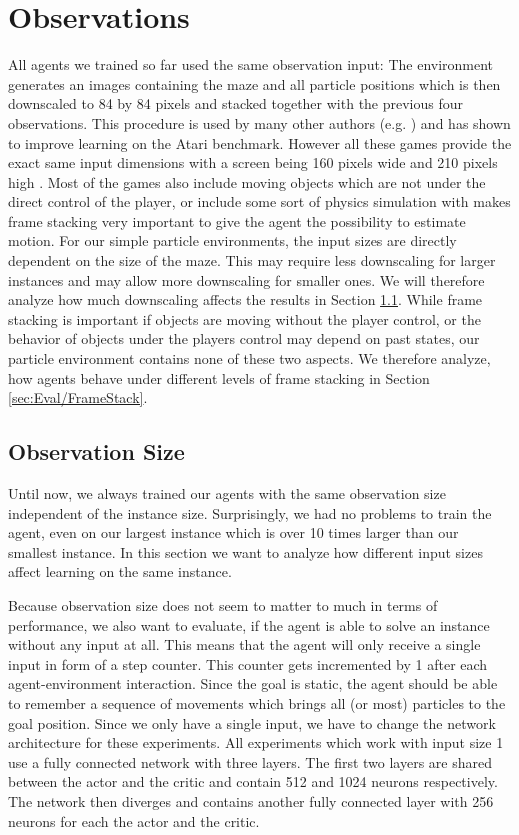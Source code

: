 \section{Observations} \label{sec:EvalObs}
All agents we trained so far used the same observation input: The environment generates an images containing the maze and all particle positions which is then downscaled to 84 by 84 pixels and stacked together with the previous four observations. This procedure is used by many other authors (e.g. \cite{burda2018large, mnih2015human}) and has shown to improve learning on the Atari benchmark. However all these games provide the exact same input dimensions with a screen being 160 pixels wide and 210 pixels high \cite{bellemare2013arcade}. Most of the games also include moving objects which are not under the direct control of the player, or include some sort of physics simulation with makes frame stacking very important to give the agent the possibility to estimate motion. For our simple particle environments, the input sizes are directly dependent on the size of the maze. This may require less downscaling for larger instances and may allow more downscaling for smaller ones. We will therefore analyze how much downscaling affects the results in Section \ref{sec:Eval/ObsSize}. While frame stacking is important if objects are moving without the player control, or the behavior of objects under the players control may depend on past states, our particle environment contains none of these two aspects. We therefore analyze, how agents behave under different levels of frame stacking in Section \ref{sec:Eval/FrameStack}.


\subsection{Observation Size} \label{sec:Eval/ObsSize}
Until now, we always trained our agents with the same observation size independent of the instance size. Surprisingly, we had no problems to train the agent, even on our largest instance which is over 10 times larger than our smallest instance. In this section we want to analyze how different input sizes affect learning on the same instance. 

Because observation size does not seem to matter to much in terms of performance, we also want to evaluate, if the agent is able to solve an instance without any input at all. This means that the agent will only receive a single input in form of a step counter. This counter gets incremented by 1 after each agent-environment interaction. Since the goal is static, the agent should be able to remember a sequence of movements which brings all (or most) particles to the goal position. Since we only have a single input, we have to change the network architecture for these experiments. All experiments which work with input size 1 use a fully connected network with three layers. The first two layers are shared between the actor and the critic and contain 512 and 1024 neurons respectively. The network then diverges and contains another fully connected layer with 256 neurons for each the actor and the critic.

